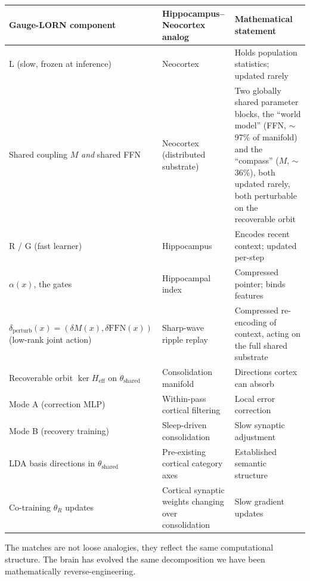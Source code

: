 \documentclass[11pt, a4paper]{article}
\theoremstyle{plain}
\theoremstyle{definition}
\theoremstyle{remark}
\begin{document}
\begin{center}
\small
\begin{tabular}{p{4.8cm} p{4.5cm} p{5.0cm}}
\toprule
Gauge-LORN component & Hippocampus--Neocortex analog & Mathematical statement \\
\midrule
L (slow, frozen at inference) & Neocortex & Holds population statistics; updated rarely \\
Shared coupling $M$ \emph{and} shared FFN & Neocortex (distributed substrate) & Two globally shared parameter blocks, the ``world model'' (FFN, $\sim$97\% of manifold) and the ``compass'' ($M$, $\sim$36\%), both updated rarely, both perturbable on the recoverable orbit \\
R / G (fast learner) & Hippocampus & Encodes recent context; updated per-step \\
$\alpha(x)$, the gates & Hippocampal index & Compressed pointer; binds features \\
$\delta_{\mathrm{perturb}}(x) = (\delta M(x), \delta\mathrm{FFN}(x))$ (low-rank joint action) & Sharp-wave ripple replay & Compressed re-encoding of context, acting on the full shared substrate \\
Recoverable orbit $\ker H_{\mathrm{eff}}$ on $\theta_{\mathrm{shared}}$ & Consolidation manifold & Directions cortex can absorb \\
Mode A (correction MLP) & Within-pass cortical filtering & Local error correction \\
Mode B (recovery training) & Sleep-driven consolidation & Slow synaptic adjustment \\
LDA basis directions in $\theta_{\mathrm{shared}}$ & Pre-existing cortical category axes & Established semantic structure \\
Co-training $\theta_R$ updates & Cortical synaptic weights changing over consolidation & Slow gradient updates \\
\bottomrule
\end{tabular}
\end{center}

The matches are not loose analogies, they reflect the same computational structure.
The brain has evolved the same decomposition we have been mathematically reverse-engineering.
\end{document}
